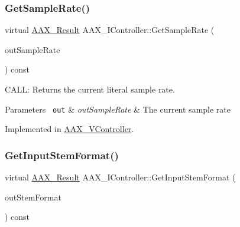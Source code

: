 \mbox{\label{a01789_afa1f9f64eeeab9570e5599f466fa699e}} 
\subsubsection{\texorpdfstring{GetSampleRate()}{GetSampleRate()}}
{\footnotesize\ttfamily virtual \mbox{\hyperlink{a00392_a4d8f69a697df7f70c3a8e9b8ee130d2f}{A\+A\+X\+\_\+\+Result}} A\+A\+X\+\_\+\+I\+Controller\+::\+Get\+Sample\+Rate (\begin{DoxyParamCaption}\item[{\mbox{\hyperlink{a00392_a3d9eea08f47e0b0a23432e15baa4e885}{A\+A\+X\+\_\+\+C\+Sample\+Rate}} $\ast$}]{out\+Sample\+Rate }\end{DoxyParamCaption}) const\hspace{0.3cm}{\ttfamily [pure virtual]}}



C\+A\+LL\+: Returns the current literal sample rate. 


\begin{DoxyParams}[1]{Parameters}
\mbox{\texttt{ out}}  & {\em out\+Sample\+Rate} & The current sample rate \\
\hline
\end{DoxyParams}


Implemented in \mbox{\hyperlink{a01905_a05b912d5178b1420b014da3b8e98e7cd}{A\+A\+X\+\_\+\+V\+Controller}}.

\mbox{\label{a01789_ab024489b47d3d5d2bcd52c9859aba663}} 
\subsubsection{\texorpdfstring{GetInputStemFormat()}{GetInputStemFormat()}}
{\footnotesize\ttfamily virtual \mbox{\hyperlink{a00392_a4d8f69a697df7f70c3a8e9b8ee130d2f}{A\+A\+X\+\_\+\+Result}} A\+A\+X\+\_\+\+I\+Controller\+::\+Get\+Input\+Stem\+Format (\begin{DoxyParamCaption}\item[{\mbox{\hyperlink{a00491_ad8af5ef008b2bd478add9a0acb0a1d85}{A\+A\+X\+\_\+\+E\+Stem\+Format}} $\ast$}]{out\+Stem\+Format }\end{DoxyParamCaption}) const\hspace{0.3cm}{\ttfamily [pure virtual]}}



